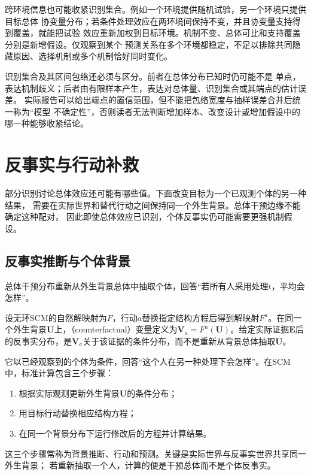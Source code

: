 跨环境信息也可能收紧识别集合。例如一个环境提供随机试验，另一个环境只提供目标总体
协变量分布；若条件处理效应在两环境间保持不变，并且协变量支持得到覆盖，就能把试验
效应重新加权到目标环境。机制不变、总体可比和支持覆盖分别是新增假设。仅观察到某个
预测关系在多个环境都稳定，不足以排除共同隐藏原因、选择机制或多个机制恰好同时变化。

识别集合及其区间包络还必须与区分。前者在总体分布已知时仍可能不是
单点，表达机制歧义；后者由有限样本产生，表达对总体量、识别集合或其端点的估计误差。
实际报告可以给出端点的置信范围，但不能把包络宽度与抽样误差合并后统一称为“模型
不确定性”，否则读者无法判断增加样本、改变设计或增加假设中的哪一种能够收紧结论。

\section{反事实与行动补救}
\label{sec:causal-counterfactual-recourse}

部分识别讨论总体效应还可能有哪些值。下面改变目标为一个已观测个体的另一种结果，
需要在实际世界和替代行动之间保持同一个外生背景。总体干预边缘不能确定这种配对，
因此即使总体效应已识别，个体反事实仍可能需要更强机制假设。

\subsection{反事实推断与个体背景}

总体干预分布重新从外生背景总体中抽取个体，回答“若所有人采用处理\(t\)，平均会怎样”。
\begin{definition}[SCM中的反事实变量]
  \label{def:causal-counterfactual}
  设无环SCM的自然解映射为\(F\)，行动\(a\)替换指定结构方程后得到解映射\(F^a\)。在同一个外生背景\(\bm U\)上，（counterfactual）变量定义为\(\bm V_a=F^a(\bm U)\)。给定实际证据\(\bm E\)后的反事实分布，是\(\bm V_a\)关于该证据的条件分布，而不是重新从背景总体抽取\(\bm U\)。
\end{definition}
它以已经观察到的个体为条件，回答“这个人在另一种处理下会怎样”。在SCM中，标准计算包含三个步骤：
\begin{enumerate}
  \item 根据实际观测更新外生背景\(\bm{U}\)的条件分布；
  \item 用目标行动替换相应结构方程；
  \item 在同一个背景分布下运行修改后的方程并计算结果。
\end{enumerate}
这三个步骤常称为背景推断、行动和预测。关键是实际世界与反事实世界共享同一外生背景；
若重新抽取一个人，计算的便是干预总体而不是个体反事实。

